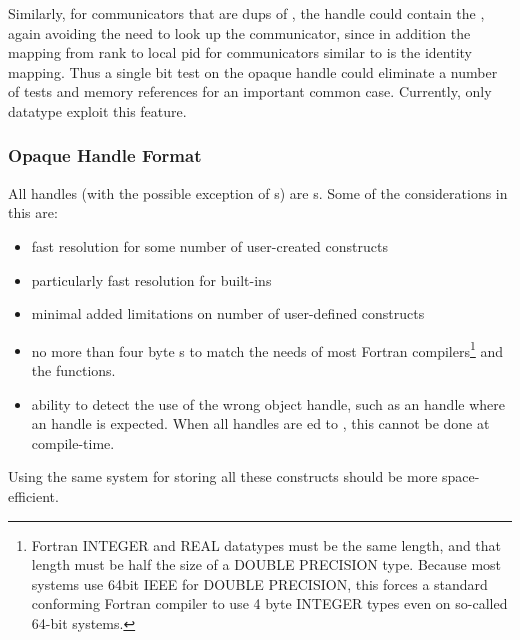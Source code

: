 \documentclass{article}
\begin{document}
Similarly, for
communicators that are dups of , the handle could
contain the , again avoiding the need to look up the
communicator, since in addition the mapping from rank to local pid for 
communicators similar to  is the identity
mapping.  Thus a single bit test on the opaque handle could eliminate
a number of tests and memory references for an important common case.
Currently, only datatype exploit this feature.

\subsubsection{Opaque Handle Format}
All handles (with the possible exception of s) are
s.  Some of the considerations in this are:
\begin{itemize}
\item fast resolution for some number of user-created constructs
\item particularly fast resolution for built-ins
\item minimal added limitations on number of user-defined constructs 
\item no more than four byte s to match the needs of most
Fortran compilers\footnote{Fortran INTEGER and REAL datatypes must be
the same length, and that length must be half the size of a DOUBLE
PRECISION type.  Because most systems use 64bit IEEE for DOUBLE
PRECISION, this forces a standard conforming Fortran compiler to use 4
byte INTEGER types even on so-called 64-bit systems.} and the
 functions. 
\item ability to detect the use of the wrong object handle, such as an
 handle where an  handle is
expected.  When all handles are ed to , this
cannot be done at compile-time.
\end{itemize}

Using the same system for storing all these constructs should be more
space-efficient.
\end{document}
